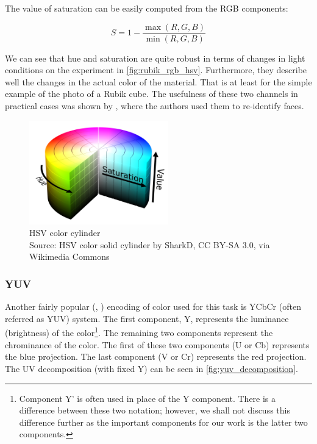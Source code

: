 The value of saturation can be easily computed from the RGB components:

$$S = 1 - \frac{\max(R,G,B)}{\min(R,G,B)}$$

We can see that hue and saturation are quite robust in terms of changes in light conditions on the experiment in \autoref{fig:rubik_rgb_hsv}. Furthermore, they describe well the changes in the actual color of the material. That is at least for the simple example of the photo of a Rubik cube. The usefulness of these two channels in practical cases was shown by \cite{mckenna1997tracking}, where the authors used them to re-identify faces.

\begin{figure}
    \centering
    \includegraphics[width=6cm]{img/HSV_color_solid_cylinder.png}
    \caption[HSV color cylinder]{HSV color cylinder\\Source: HSV color solid cylinder\protect\footnotemark{} by SharkD, CC BY-SA 3.0\protect\footnotemark{}, via Wikimedia Commons}
    \label{fig:hsv_cylinder}
\end{figure}
\addtocounter{footnote}{-2}

\subsubsection{YUV}

Another fairly popular (\cite{orwell1999multi}, \cite{wren1997pfinder}) encoding of color used for this task is YCbCr (often referred as YUV) system. The first component, Y, represents the luminance (brightness) of the color\footnote{Component Y' is often used in place of the Y component. There is a difference between these two notation; however, we shall not discuss this difference further as the important components for our work is the latter two components.}. The remaining two components represent the chrominance of the color. The first of these two components (U or Cb) represents the blue projection. The last component (V or Cr) represents the red projection. The UV decomposition (with fixed Y) can be seen in \autoref{fig:yuv_decomposition}.

